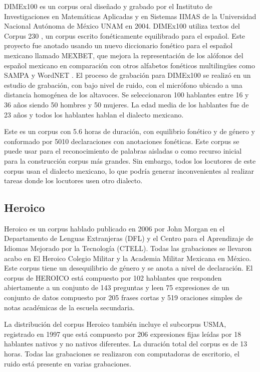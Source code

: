 DIMEx100 \cite{Pineda2004DIMEx100:Spanish} es un corpus oral diseñado y grabado por el Instituto de Investigaciones en Matemáticas Aplicadas y en Sistemas IIMAS de la Universidad Nacional Autónoma de México UNAM en 2004. DIMEx100 utiliza textos del Corpus 230 \cite{Corpus230}, un corpus escrito fonéticamente equilibrado para el español. Este proyecto fue anotado usando un nuevo diccionario fonético para el español mexicano llamado MEXBET, que mejora la representación de los alófonos del español mexicano en comparación con otros alfabetos fonéticos multilingües como SAMPA y WordNET \cite{mexbet}. El proceso de grabación para DIMEx100 se realizó en un estudio de grabación, con bajo nivel de ruido, con el micrófono ubicado a una distancia homogénea de los altavoces. Se seleccionaron 100 hablantes entre 16 y 36 años siendo 50 hombres y 50 mujeres. La edad media de los hablantes fue de 23 años y todos los hablantes hablan el dialecto mexicano.

Este es un corpus con 5.6 horas de duración, con equilibrio fonético y de género y conformado por 5010 declaraciones con anotaciones fonéticas. Este corpus se puede usar para el reconocimiento de palabras aisladas o como recurso inicial para la construcción corpus más grandes. Sin embargo, todos los locutores de este corpus usan el dialecto mexicano, lo que podría generar inconvenientes al realizar tareas donde los locutores usen otro dialecto.

\subsection{Heroico}

Heroico \cite{heroico} es un corpus hablado publicado en 2006 por John Morgan en el Departamento de Lenguas Extranjeras (DFL) y el Centro para el Aprendizaje de Idiomas Mejorado por la Tecnología (CTELL). Todas las grabaciones se llevaron acabo en El Heroico Colegio Militar y la Academia Militar Mexicana en México. Este corpus tiene un desequilibrio de género y se anota a nivel de declaración. El corpus de HEROICO está compuesto por 102 hablantes que responden abiertamente a un conjunto de 143 preguntas y leen 75 expresiones de un conjunto de datos compuesto por 205 frases cortas y 519 oraciones simples de notas académicas de la escuela secundaria.

La distribución del corpus Heroico también incluye el subcorpus USMA, registrado en 1997 que está compuesto por 206 expresiones fijas leídas por 18 hablantes nativos y no nativos diferentes. La duración total del corpus es de 13 horas. Todas las grabaciones se realizaron con computadoras de escritorio, el ruido está presente en varias grabaciones.

